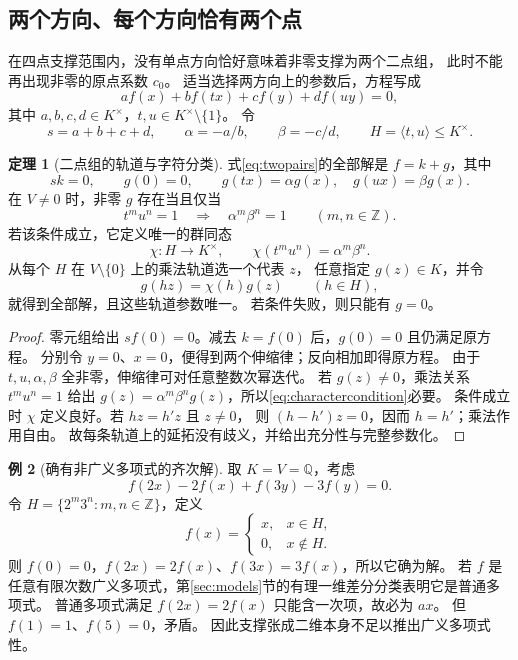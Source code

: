 \documentclass[UTF8,11pt,a4paper]{ctexart}
\theoremstyle{definition}
\newtheorem{theorem}{定理}[section]
\newtheorem{example}[theorem]{例}
\newcommand{\Q}{\mathbb Q}
\newcommand{\Z}{\mathbb Z}
\numberwithin{equation}{section}
\begin{document}
\subsection{两个方向、每个方向恰有两个点}
在四点支撑范围内，没有单点方向恰好意味着非零支撑为两个二点组，
此时不能再出现非零的原点系数 $c_0$。
适当选择两方向上的参数后，方程写成
\begin{equation}\label{eq:twopairs}
 af(x)+bf(tx)+cf(y)+df(uy)=0,
\end{equation}
其中 $a,b,c,d\in K^\times$，$t,u\in K^\times\setminus\{1\}$。
令
\[
 s=a+b+c+d,\qquad \alpha=-a/b,\qquad\beta=-c/d,\qquad
 H=\langle t,u\rangle\le K^\times.
\]

\begin{theorem}[二点组的轨道与字符分类]\label{thm:orbit}
式\eqref{eq:twopairs}的全部解是 $f=k+g$，其中
\[
 sk=0,\qquad g(0)=0,\qquad
 g(tx)=\alpha g(x),\quad g(ux)=\beta g(x).
\]
在 $V\ne0$ 时，非零 $g$ 存在当且仅当
\begin{equation}\label{eq:charactercondition}
 t^m u^n=1\quad\Longrightarrow\quad
 \alpha^m\beta^n=1
 \qquad(m,n\in\Z).
\end{equation}
若该条件成立，它定义唯一的群同态
\[
 \chi:H\to K^\times,\qquad
 \chi(t^mu^n)=\alpha^m\beta^n.
\]
从每个 $H$ 在 $V\setminus\{0\}$ 上的乘法轨道选一个代表 $z$，
任意指定 $g(z)\in K$，并令
\[
 g(hz)=\chi(h)g(z)\qquad(h\in H),
\]
就得到全部解，且这些轨道参数唯一。
若条件失败，则只能有 $g=0$。
\end{theorem}
\begin{proof}
零元组给出 $sf(0)=0$。减去 $k=f(0)$ 后，$g(0)=0$ 且仍满足原方程。
分别令 $y=0$、$x=0$，便得到两个伸缩律；反向相加即得原方程。
由于 $t,u,\alpha,\beta$ 全非零，伸缩律可对任意整数次幂迭代。
若 $g(z)\ne0$，乘法关系 $t^mu^n=1$ 给出
$g(z)=\alpha^m\beta^n g(z)$，所以\eqref{eq:charactercondition}必要。
条件成立时 $\chi$ 定义良好。若 $hz=h'z$ 且 $z\ne0$，
则 $(h-h')z=0$，因而 $h=h'$；乘法作用自由。
故每条轨道上的延拓没有歧义，并给出充分性与完整参数化。
\end{proof}

\begin{example}[确有非广义多项式的齐次解]\label{ex:nongeneral}
取 $K=V=\Q$，考虑
\[
 f(2x)-2f(x)+f(3y)-3f(y)=0.
\]
令 $H=\{2^m3^n:m,n\in\Z\}$，定义
\[
 f(x)=
 \begin{cases}
 x,&x\in H,\\
 0,&x\notin H.
 \end{cases}
\]
则 $f(0)=0$，$f(2x)=2f(x)$、$f(3x)=3f(x)$，所以它确为解。
若 $f$ 是任意有限次数广义多项式，第\ref{sec:models}节的有理一维差分分类表明它是普通多项式。
普通多项式满足 $f(2x)=2f(x)$ 只能含一次项，故必为 $ax$。
但 $f(1)=1$、$f(5)=0$，矛盾。
因此支撑张成二维本身不足以推出广义多项式性。
\end{example}
\end{document}
